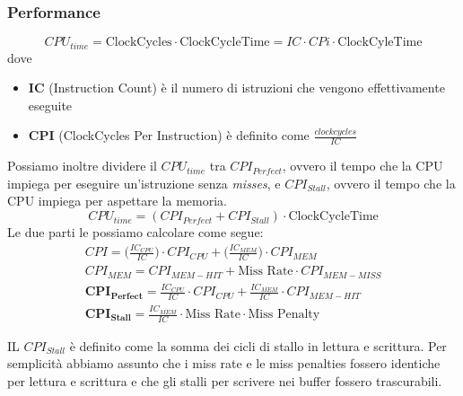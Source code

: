 \subsubsection{Performance}
\begin{equation}
	CPU_{time} = \text{ClockCycles} \cdot \text{ClockCycleTime} = IC \cdot CPi \cdot \text{ClockCyleTime}
\end{equation}
dove
\begin{itemize}
    \item \textbf{IC} (Instruction Count) è il numero di istruzioni che vengono effettivamente eseguite
    \item \textbf{CPI} (ClockCycles Per Instruction) è definito come \(\frac{clockcycles}{IC}\)
\end{itemize}
Possiamo inoltre dividere il $CPU_{time}$ tra \textbf{$CPI_{Perfect}$}, ovvero il tempo che la CPU impiega per eseguire un'istruzione senza \emph{misses}, e \textbf{$CPI_{Stall}$}, ovvero il tempo che la CPU impiega per aspettare la memoria.
\begin{equation}
	CPU_{time} = (CPI_{Perfect} + CPI_{Stall}) \cdot \text{ClockCycleTime}
\end{equation}
Le due parti le possiamo calcolare come segue:
\begin{equation}
	\begin{split}
		CPI = \bigg(\frac{IC_{CPU}}{IC}\bigg) \cdot CPI_{CPU} + \bigg(\frac{IC_{MEM}}{IC}\bigg) \cdot CPI_{MEM} \\
		CPI_{MEM} = CPI_{MEM-HIT} + \text{Miss Rate} \cdot CPI_{MEM-MISS} \\
		\mathbf{CPI_{Perfect}} = \frac{IC_{CPU}}{IC} \cdot CPI_{CPU} + \frac{IC_{MEM}}{IC} \cdot CPI_{MEM-HIT} \\
		\mathbf{CPI_{Stall}} = \frac{IC_{MEM}}{IC} \cdot \text{Miss Rate} \cdot \text{Miss Penalty}
	\end{split}
\end{equation}

\begin{observation}
	IL $CPI_{Stall}$ è definito come la somma dei cicli di stallo in lettura e scrittura. Per semplicità abbiamo assunto che i miss rate e le miss penalties fossero identiche per lettura e scrittura e che gli stalli per scrivere nei buffer fossero trascurabili.
\end{observation}

